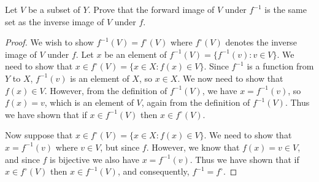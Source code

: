 \documentclass[12pt]{article}
\newenvironment{exercise}[2][Exercise]{\begin{trivlist}
\item[\hskip \labelsep {\bfseries #1}\hskip \labelsep {\bfseries #2}]}{\end{trivlist}}
\begin{document}
\begin{exercise}{3.4.1}
	Let $ V $ be a subset of $ Y $.
	Prove that the forward image of $ V $ under $ f^{-1} $ is the same set as the inverse image of $ V $ under $ f $.
\end{exercise}
\begin{proof}
	We wish to show $ f^{-1}(V) = f^{\circ}(V) $ where $ f^{\circ}(V) $ denotes the inverse image of $ V $ under $ f $.
	Let $ x $ be an element of $ f^{-1}(V) = \{ f^{-1}(v) : v \in V \} $.
	We need to show that $ x \in f^{\circ}(V) = \{ x \in X : f(x) \in V \} $.
	Since $ f^{-1} $ is a function from $ Y $ to $ X $, $ f^{-1}(v) $ is an element of $ X $, so $ x \in X $.
	We now need to show that $ f(x) \in V $.
	However, from the definition of $ f^{-1}(V) $, we have $ x = f^{-1}(v) $, so $ f(x) = v $, which is an element of $ V $, again from the definition of $ f^{-1}(V) $.
	Thus we have shown that if $ x \in f^{-1}(V) $ then $ x \in f^{\circ}(V) $.
	
	Now suppose that $ x \in f^{\circ}(V) = \{ x \in X : f(x) \in V \} $.
	We need to show that $ x = f^{-1}(v) $ where $ v \in V $, but since $ f $.
	However, we know that $ f(x) = v \in V $, and since $ f $ is bijective we also have $ x = f^{-1}(v) $.
	Thus we have shown that if $ x \in f^{\circ}(V) $ then $ x \in f^{-1}(V) $, and consequently, $ f^{-1} = f^{\circ} $.
\end{proof}
\end{document}
